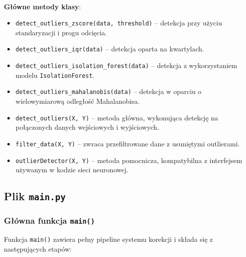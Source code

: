 \documentclass{classrep}
\begin{document}
\paragraph{}
\textbf{Główne metody klasy}:
\begin{itemize}
	\item \texttt{detect\_outliers\_zscore(data, threshold)} – detekcja przy użyciu standaryzacji i progu odcięcia.
	\item \texttt{detect\_outliers\_iqr(data)} – detekcja oparta na kwartylach.
	\item \texttt{detect\_outliers\_isolation\_forest(data)} – detekcja z wykorzystaniem modelu \texttt{IsolationForest}.
	\item \texttt{detect\_outliers\_mahalanobis(data)} – detekcja w oparciu o wielowymiarową odległość Mahalanobisa.
	\item \texttt{detect\_outliers(X, Y)} – metoda główna, wykonująca detekcję na połączonych danych wejściowych i wyjściowych.
	\item \texttt{filter\_data(X, Y)} – zwraca przefiltrowane dane z usuniętymi outlierami.
	\item \texttt{outlierDetector(X, Y)} – metoda pomocnicza, kompatybilna z interfejsem używanym w kodzie sieci neuronowej.
\end{itemize}

\clearpage{}

\subsection{Plik \texttt{main.py}}

\subsubsection*{Główna funkcja \texttt{main()}}

Funkcja \texttt{main()} zawiera pełny pipeline systemu korekcji i składa się z następujących etapów:
\end{document}
